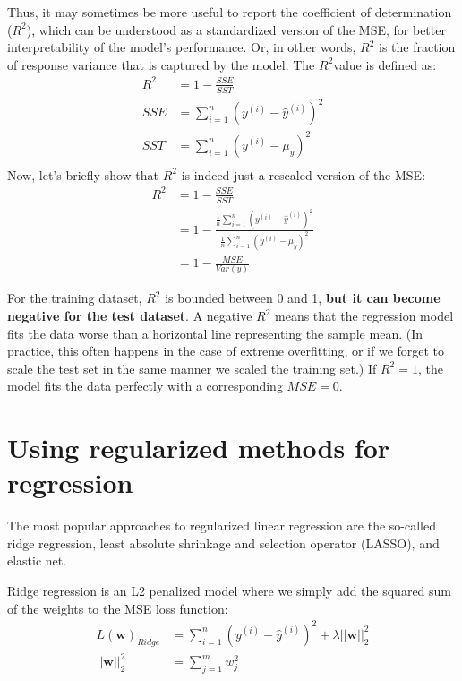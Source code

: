 Thus, it may sometimes be more useful to report the coefficient of determination ($R^2$), which can be understood as a standardized version of the MSE, for better interpretability of the model's performance. Or, in other words, $R^2$ is the fraction of response variance that is captured by the model. The $R^2$value is defined as:
\begin{equation}
    \begin{aligned}
        R^2 & =1-\frac{SSE}{SST}                       \\
        SSE & =\sum_{i=1}^{n}(y^{(i)}-\hat{y}^{(i)})^2 \\
        SST & =\sum_{i=1}^{n}(y^{(i)}-\mu_y)^2         \\
    \end{aligned}
\end{equation}
Now, let’s briefly show that $R^2$ is indeed just a rescaled version of the MSE:
\begin{equation}
    \begin{aligned}
        R^2 & =1-\frac{SSE}{SST}                                                                                       \\
            & =1-\frac{\frac{1}{n}\sum_{i=1}^{n}(y^{(i)}-\hat{y}^{(i)})^2}{\frac{1}{n}\sum_{i=1}^{n}(y^{(i)}-\mu_y)^2} \\
            & =1-\frac{MSE}{Var(y)}
    \end{aligned}
\end{equation}

For the training dataset, $R^2$ is bounded between 0 and 1, \textbf{but it can become negative for the test dataset}. A negative $R^2$ means that the regression model fits the data worse than a horizontal line representing the sample mean. (In practice, this often happens in the case of extreme overfitting, or if we forget to scale the test set in the same manner we scaled the training set.) If $R^2 = 1$, the model fits the data perfectly with a corresponding $MSE = 0$.

\section{Using regularized methods for regression}
The most popular approaches to regularized linear regression are the so-called ridge regression, least absolute shrinkage and selection operator (LASSO), and elastic net.

Ridge regression is an L2 penalized model where we simply add the squared sum of the weights to the MSE loss function:
\begin{equation}
    \begin{aligned}
        L(\textbf{w})_{Ridge} & =\sum_{i=1}^{n}(y^{(i)}-\hat{y}^{(i)})^2+\lambda||\textbf{w}||^2_2 \\
        ||\textbf{w}||^2_2    & =\sum_{j=1}^{m}w_j^2                                               \\
    \end{aligned}
\end{equation}

